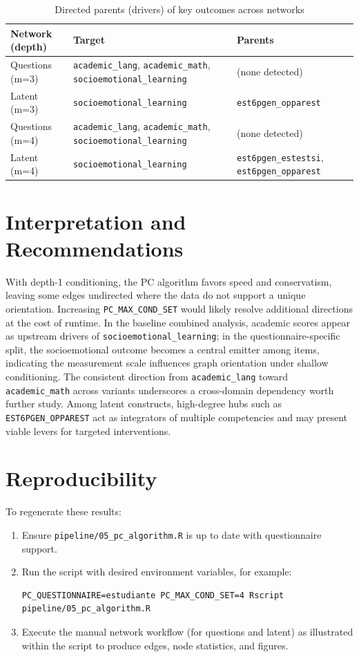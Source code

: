 \documentclass[11pt]{article}
\begin{document}
\begin{table}[H]
  \centering
  \caption{Directed parents (drivers) of key outcomes across networks}
  \label{tab:drivers}
  \begin{tabular}{@{}lll@{}}
    \toprule
    Network (depth) & Target & Parents \\
    \midrule
    Questions (m=3) & \texttt{academic\_lang}, \texttt{academic\_math}, \texttt{socioemotional\_learning} & (none detected) \\
    Latent (m=3) & \texttt{socioemotional\_learning} & \texttt{est6pgen\_opparest} \\
    Questions (m=4) & \texttt{academic\_lang}, \texttt{academic\_math}, \texttt{socioemotional\_learning} & (none detected) \\
    Latent (m=4) & \texttt{socioemotional\_learning} & \texttt{est6pgen\_estestsi}, \texttt{est6pgen\_opparest} \\
    \bottomrule
  \end{tabular}
\end{table}


\section{Interpretation and Recommendations}
With depth-1 conditioning, the PC algorithm favors speed and conservatism, leaving some edges undirected where the data do not support a unique orientation. Increasing \texttt{PC\_MAX\_COND\_SET} would likely resolve additional directions at the cost of runtime. In the baseline combined analysis, academic scores appear as upstream drivers of \texttt{socioemotional\_learning}; in the questionnaire-specific split, the socioemotional outcome becomes a central emitter among items, indicating the measurement scale influences graph orientation under shallow conditioning. The consistent direction from \texttt{academic\_lang} toward \texttt{academic\_math} across variants underscores a cross-domain dependency worth further study. Among latent constructs, high-degree hubs such as \texttt{EST6PGEN\_OPPAREST} act as integrators of multiple competencies and may present viable levers for targeted interventions.

\section{Reproducibility}
To regenerate these results:
\begin{enumerate}
  \item Ensure \texttt{pipeline/05\_pc\_algorithm.R} is up to date with questionnaire support.
  \item Run the script with desired environment variables, for example:
\begin{verbatim}
PC_QUESTIONNAIRE=estudiante PC_MAX_COND_SET=4 Rscript pipeline/05_pc_algorithm.R
\end{verbatim}
  \item Execute the manual network workflow (for questions and latent) as illustrated within the script to produce edges, node statistics, and figures.
\end{enumerate}
\end{document}
